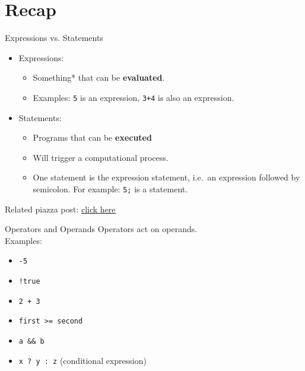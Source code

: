 \documentclass[10pt]{beamer}
\begin{document}
\section[Recap]{Recap}

{%
\begin{frame}[fragile]{Expressions vs. Statements}
  \begin{itemize}
    \item Expressions: \\
    \begin{itemize}
      \item Something* that can be \textbf{evaluated}.
      \item Examples: \verb|5| is an expression, \verb|3+4| is also an expression.
    \end{itemize}

    \item Statements: \\
    \begin{itemize}
      \item Programs that can be \textbf{executed}
      \item Will trigger a computational process.
      \item One statement is the expression statement, i.e.\ an expression followed by semicolon. For example: \verb|5;| is a statement.
    \end{itemize}

  \end{itemize}  
  Related piazza post: \href{https://piazza.com/class/kas136yscf8605?cid=79}{\underline{click here}}
\end{frame}
}

\begin{frame}[fragile]{Operators and Operands}
  Operators act on operands. \\
  Examples:
  \begin{itemize}
    \item \texttt{-5}
    \item \verb|!true|
    \item \verb|2 + 3|
    \item \verb|first >= second|
    \item \verb|a && b|
    \item \verb|x ? y : z| (conditional expression)
  \end{itemize}  
\end{frame}
\end{document}
